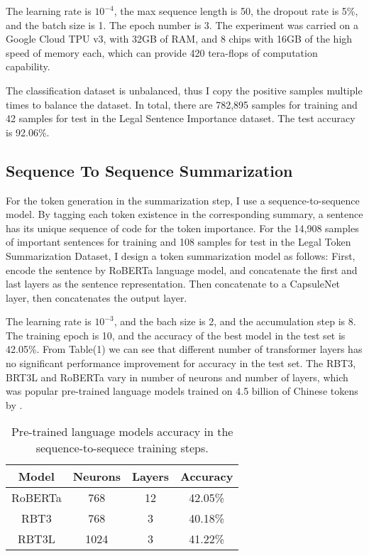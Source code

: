 \documentclass[11pt,a4paper]{article}
\begin{document}
The learning rate is $10^{-4}$, the max sequence length is 50, the dropout rate is 5\%, and the batch size is 1.
The epoch number is 3.
The experiment was carried on a Google Cloud TPU v3, with 32GB of RAM, and 8 chips with 16GB of the high speed of memory each,
which can provide 420 tera-flops of computation capability.

The classification dataset is unbalanced, thus I copy the positive samples multiple times to balance the dataset.
In total, there are 782,895 samples for training and 42 samples for test in the Legal Sentence Importance dataset.
The test accuracy is 92.06\%.

\subsection{Sequence To Sequence Summarization}

For the token generation in the summarization step, I use a sequence-to-sequence model.
By tagging each token existence in the corresponding summary, a sentence has its unique sequence of code for the token importance.
For the 14,908 samples of important sentences for training and 108 samples for test in the Legal Token Summarization Dataset,
I design a token summarization model as follows:
First, encode the sentence by RoBERTa language model, and concatenate the first and last layers as the sentence representation.
Then concatenate to a CapsuleNet layer, then concatenates the output layer.

The learning rate is $10^{-3}$, and the bach size is 2, and the accumulation step is 8.
The training epoch is 10, and the accuracy of the best model in the test set is 42.05\%.
From Table(1) we can see that different number of transformer layers has no significant performance improvement for accuracy in the test set.
The RBT3, BRT3L and RoBERTa vary in number of neurons and number of layers,
which was popular pre-trained language models trained on 4.5 billion of Chinese tokens by \citet{cui2020revisiting}.

\begin{table}
\centering
\begin{tabular}{cccc}
\hline
\textbf{Model} & \textbf{Neurons}& \textbf{Layers} & \textbf{Accuracy} \\
\hline
RoBERTa & 768 & 12 & 42.05\% \\
RBT3 & 768 & 3 & 40.18\% \\
RBT3L & 1024 & 3 & 41.22\% \\
\hline
\end{tabular}
\caption{Pre-trained language models accuracy in the sequence-to-sequece training steps.}
\end{table}
\end{document}

